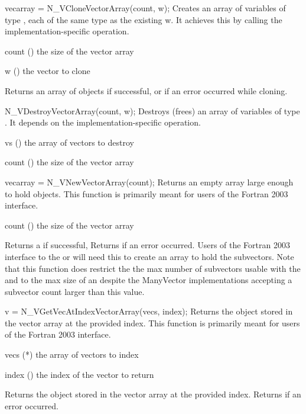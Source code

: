{
  vecarray = N\_VCloneVectorArray(count, w);
}
{
  Creates an array of  variables of type ,
  each of the same type as the existing  w. It achieves
  this by calling the implementation-specific  operation.
}
{
  \begin{args}[count]
  \item[count] () the size of the vector array
  \item[w] () the vector to clone
  \end{args}
}
{
  Returns an array of   objects if successful, or
   if an error occurred while cloning.
}
{}

{
   N\_VDestroyVectorArray(count, w);
}
{
  Destroys (frees) an array of variables of type . It
  depends on the implementation-specific  operation.
}
{
  \begin{args}[count]
  \item[vs] () the array of vectors to destroy
  \item[count] () the size of the vector array
  \end{args}
}
{}
{}

{
  vecarray = N\_VNewVectorArray(count);
}
{
  Returns an empty  array large enough to hold 
   objects. This function is primarily meant for users of
  the Fortran 2003 interface.
}
{
  \begin{args}[count]
  \item[count] () the size of the vector array
  \end{args}
}
{
  Returns a  if successful, Returns  if an error occurred.
}
{
  Users of the Fortran 2003 interface to the  or
   will need this to create an array to hold
  the subvectors. Note that this function does restrict the the max
  number of subvectors usable with the  and
   to the max size of an  despite the
  ManyVector implementations accepting a subvector count larger than
  this value.
}

{
  v = N\_VGetVecAtIndexVectorArray(vecs, index);
}
{
  Returns the  object stored in the vector array at the
  provided index. This function is primarily meant for users of the
  Fortran 2003 interface.
}
{
  \begin{args}[count]
  \item[vecs] (*) the array of vectors to index
  \item[index] () the index of the vector to return
  \end{args}
}
{
  Returns the  object stored in the vector array at the
  provided index. Returns  if an error occurred.
}
{}

